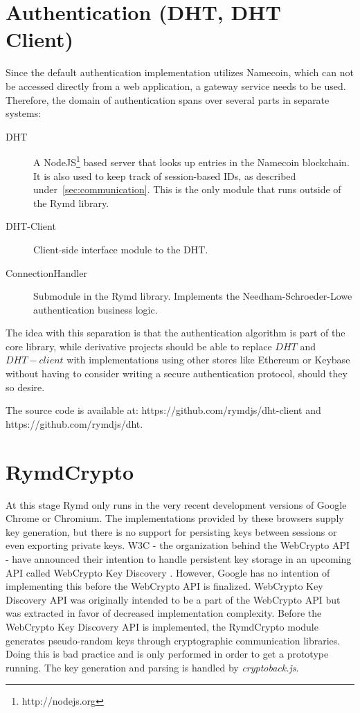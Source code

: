 \section{Authentication (DHT, DHT Client)}
\label{sec:authentication}
Since the default authentication implementation utilizes Namecoin, which can not be accessed directly from a web application, a gateway service needs to be used. Therefore, the domain of authentication spans over several parts in separate systems:

\begin{description}
  \item[DHT] A NodeJS\footnote{http://nodejs.org} based server that looks up entries in the Namecoin blockchain. It is also used to keep track of session-based IDs, as described under~\ref{sec:communication}. This is the only module that runs outside of the Rymd library.
  \item[DHT-Client] Client-side interface module to the DHT.
  \item[ConnectionHandler] Submodule in the Rymd library. Implements the Needham-Schroeder-Lowe authentication business logic.
\end{description}

The idea with this separation is that the authentication algorithm is part of the core library, while derivative projects should be able to replace $DHT$ and $DHT-client$ with implementations using other stores like Ethereum or Keybase without having to consider writing a secure authentication protocol, should they so desire.

The source code is available at: https://github.com/rymdjs/dht-client and https://github.com/rymdjs/dht.

\section{RymdCrypto}
\label{sec:cryptography}
At this stage Rymd only runs in the very recent development versions of Google Chrome or Chromium. The implementations provided by these browsers supply key generation, but there is no support for persisting keys between sessions or even exporting private keys. W3C - the organization behind the WebCrypto API - have announced their intention to handle persistent key storage in an upcoming API called WebCrypto Key Discovery \cite{WebCryptoKeyDiscovery:Online}. However, Google has no intention of implementing this before the WebCrypto API is finalized. WebCrypto Key Discovery API was originally intended to be a part of the WebCrypto API but was extracted in favor of decreased implementation complexity. Before the WebCrypto Key Discovery API is implemented, the RymdCrypto module generates pseudo-random keys through cryptographic communication libraries. Doing this is bad practice and is only performed in order to get a prototype running. The key generation and parsing is handled by \emph{cryptoback.js}.

